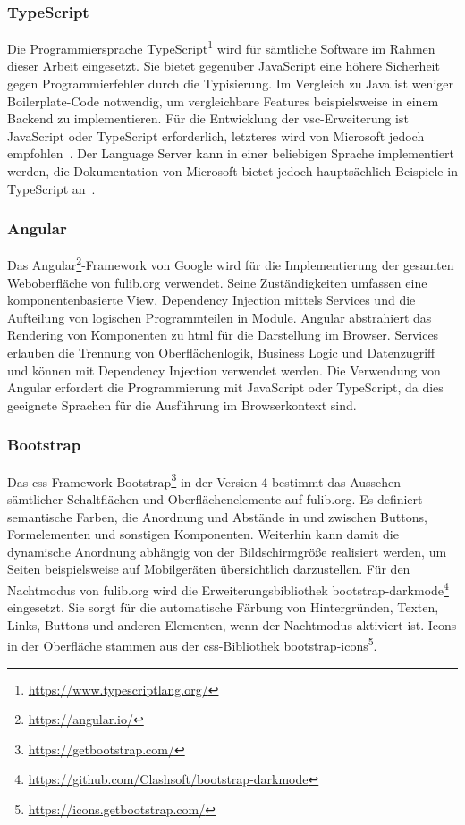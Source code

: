 \subsubsection{TypeScript}
Die Programmiersprache TypeScript\footnote{\url{https://www.typescriptlang.org/}} wird für sämtliche Software im Rahmen dieser Arbeit eingesetzt.
Sie bietet gegenüber JavaScript eine höhere Sicherheit gegen Programmierfehler durch die Typisierung.
Im Vergleich zu Java ist weniger Boilerplate-Code notwendig, um vergleichbare Features beispielsweise in einem Backend zu implementieren.
Für die Entwicklung der \ac{vsc}-Erweiterung ist JavaScript oder TypeScript erforderlich, letzteres wird von Microsoft jedoch empfohlen~\cite{vsc-first-extension}.
Der Language Server kann in einer beliebigen Sprache implementiert werden, die Dokumentation von Microsoft bietet jedoch hauptsächlich Beispiele in TypeScript an~\cite{vsc-language-server-guide}.

\subsubsection{Angular}
Das Angular\footnote{\url{https://angular.io/}}-Framework von Google wird für die Implementierung der gesamten Weboberfläche von fulib.org verwendet.
Seine Zuständigkeiten umfassen eine komponentenbasierte View, Dependency Injection mittels Services und die Aufteilung von logischen Programmteilen in Module.
Angular abstrahiert das Rendering von Komponenten zu \ac{html} für die Darstellung im Browser.
Services erlauben die Trennung von Oberflächenlogik, Business Logic und Datenzugriff und können mit Dependency Injection verwendet werden.
Die Verwendung von Angular erfordert die Programmierung mit JavaScript oder TypeScript, da dies geeignete Sprachen für die Ausführung im Browserkontext sind.

\subsubsection{Bootstrap}
Das \ac{css}-Framework Bootstrap\footnote{\url{https://getbootstrap.com/}} in der Version 4 bestimmt das Aussehen sämtlicher Schaltflächen und Oberflächenelemente auf fulib.org.
Es definiert semantische Farben, die Anordnung und Abstände in und zwischen Buttons, Formelementen und sonstigen Komponenten.
Weiterhin kann damit die dynamische Anordnung abhängig von der Bildschirmgröße realisiert werden, um Seiten beispielsweise auf Mobilgeräten übersichtlich darzustellen.
Für den Nachtmodus von fulib.org wird die Erweiterungsbibliothek bootstrap-darkmode\footnote{\url{https://github.com/Clashsoft/bootstrap-darkmode}} eingesetzt.
Sie sorgt für die automatische Färbung von Hintergründen, Texten, Links, Buttons und anderen Elementen, wenn der Nachtmodus aktiviert ist.
Icons in der Oberfläche stammen aus der \ac{css}-Bibliothek bootstrap-icons\footnote{\url{https://icons.getbootstrap.com/}}.

